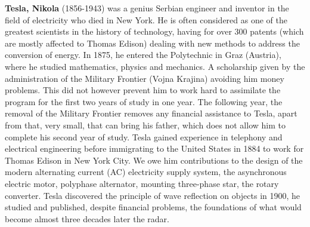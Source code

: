 \textbf{Tesla, Nikola} (1856-1943) was a genius Serbian engineer and inventor in the field of electricity who died in New York. He is often considered as one of the greatest scientists in the history of technology, having for over 300 patents (which are mostly affected to Thomas Edison) dealing with new methods to address the conversion of energy. In 1875, he entered the Polytechnic in Graz (Austria), where he studied mathematics, physics and mechanics. A scholarship given by the administration of the Military Frontier (Vojna Krajina) avoiding him money problems. This did not however prevent him to work hard to assimilate the program for the first two years of study in one year. The following year, the removal of the Military Frontier removes any financial assistance to Tesla, apart from that, very small, that can bring his father, which does not allow him to complete his second year of study. Tesla gained experience in telephony and electrical engineering before immigrating to the United States in 1884 to work for Thomas Edison in New York City. We owe him contributions to the design of the modern alternating current (AC) electricity supply system, the asynchronous electric motor, polyphase alternator, mounting three-phase star, the rotary converter. Tesla discovered the principle of wave reflection on objects in 1900, he studied and published, despite financial problems, the foundations of what would become almost three decades later the radar.

